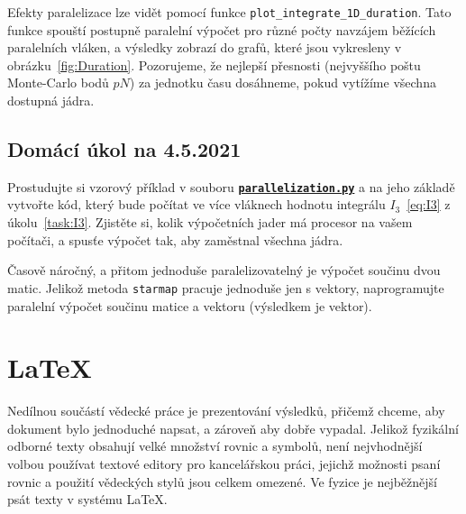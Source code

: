 \documentclass[a4paper,11pt,twoside]{article}
\def\code#1{\textnormal{\texttt{#1}}}
\def\ghfile#1#2{\textnormal{\textbf{\texttt{\href{https://github.com/PavelStransky/PCInPhysics2021/blob/main/#1#2}{#2}}}}}
\theoremstyle{red}
\theoremstyle{green}
\begin{document}
    Efekty paralelizace lze vidět pomocí funkce \code{plot_integrate_1D_duration}.
    Tato funkce spouští postupně paralelní výpočet pro různé počty navzájem běžících paralelních vláken,
    a výsledky zobrazí do grafů, které jsou vykresleny v obrázku~\ref{fig:Duration}.  
    Pozorujeme, že nejlepší přesnosti (nejvyššího poštu Monte-Carlo bodů $pN$) za jednotku času dosáhneme, pokud vytížíme všechna dostupná jádra. 

    \newpage
    \subsection{Domácí úkol na 4.5.2021}
    \begin{task}
        Prostudujte si vzorový příklad v souboru \ghfile{python/montecarlo/}{parallelization.py} a na jeho základě vytvořte kód, který bude počítat ve více vláknech hodnotu integrálu $I_{3}$~\eqref{eq:I3} z úkolu~\ref{task:I3}.
        Zjistěte si, kolik výpočetních jader má procesor na vašem počítači, a spusťe výpočet tak, aby zaměstnal všechna jádra.
    \end{task}

    \begin{task}
        Časově náročný, a přitom jednoduše paralelizovatelný je výpočet součinu dvou matic.
        Jelikož metoda \code{starmap} pracuje jednoduše jen s vektory, naprogramujte paralelní výpočet součinu matice a vektoru (výsledkem je vektor).
    \end{task}

    \section{LaTeX}
    Nedílnou součástí vědecké práce je prezentování výsledků, přičemž chceme, aby dokument bylo jednoduché napsat, a zároveň aby dobře vypadal.
    Jelikož fyzikální odborné texty obsahují velké množství rovnic a symbolů, není nejvhodnější volbou používat textové editory pro kancelářskou práci, jejichž možnosti psaní rovnic a použití vědeckých stylů jsou celkem omezené.
    Ve fyzice je nejběžnější psát texty v systému \LaTeX. 
    
\end{document}
